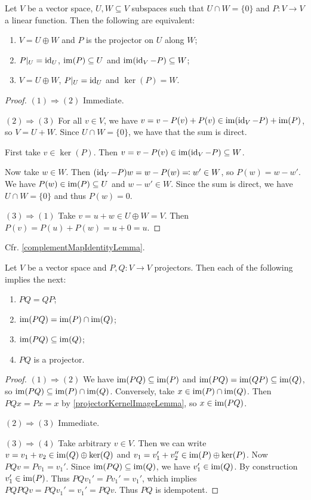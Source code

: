 \begin{lemma} \label{projectorEquivalentsLemma}
Let $V$ be a vector space, $U, W\subseteq V$  subspaces such that $U\cap W = \{0\}$ and $P: V\to V$ a linear function. Then the following are equivalent:
\begin{enumerate}
\item $V = U\oplus W$ and $P$ is the projector on $U$ along $W$;
\item $P|_U = \operatorname{id}_U$, $\operatorname{im}(P) \subseteq U$ and $\operatorname{im}(\operatorname{id}_V - P) \subseteq W$;
\item $V = U\oplus W$, $P|_U = \operatorname{id}_U$ and $\ker(P) = W$.
\end{enumerate}
\end{lemma}
\begin{proof}
$(1) \Rightarrow (2)$ Immediate.

$(2) \Rightarrow (3)$ For all $v\in V$, we have $v = v -P(v) + P(v) \in \operatorname{im}(\operatorname{id}_V - P) + \operatorname{im}(P)$, so $V = U+W$. Since $U\cap W = \{0\}$, we have that the sum is direct.

First take $v\in \ker(P)$. Then $v = v-P(v) \in \operatorname{im}(\operatorname{id}_V - P) \subseteq W$.

Now take $w\in W$. Then $(\operatorname{id}_V - P)w = w - P(w) \eqqcolon w' \in W$, so $P(w) = w - w'$. We have $P(w) \in \operatorname{im}(P) \subseteq U$ and $w-w'\in W$. Since the sum is direct, we have $U\cap W = \{0\}$ and thus $P(w) = 0$.

$(3) \Rightarrow (1)$ Take $v = u+w \in U\oplus W = V$. Then $P(v) = P(u)+ P(w) = u+0 = u$.
\end{proof}

Cfr. \ref{complementMapIdentityLemma}.

\begin{lemma} \label{commutingProjectorLemma}
Let $V$ be a vector space and $P,Q: V\to V$ projectors. Then each of the following implies the next:
\begin{enumerate}
\item $PQ = QP$;
\item $\operatorname{im}(PQ) = \operatorname{im}(P)\cap \operatorname{im}(Q)$;
\item $\operatorname{im}(PQ) \subseteq \operatorname{im}(Q)$;
\item $PQ$ is a projector.
\end{enumerate}
\end{lemma}
\begin{proof}
$(1) \Rightarrow (2)$ We have $\operatorname{im}(PQ) \subseteq \operatorname{im}(P)$ and $\operatorname{im}(PQ) = \operatorname{im}(QP) \subseteq \operatorname{im}(Q)$, so $\operatorname{im}(PQ) \subseteq \operatorname{im}(P)\cap \operatorname{im}(Q)$. Conversely, take $x\in \operatorname{im}(P)\cap\operatorname{im}(Q)$. Then $PQx = Px = x$ by \ref{projectorKernelImageLemma}, so $x\in \operatorname{im}(PQ)$.

$(2) \Rightarrow (3)$ Immediate.

$(3) \Rightarrow (4)$ Take arbitrary $v\in V$. Then we can write $v = v_1 + v_2 \in \operatorname{im}(Q)\oplus \ker(Q)$ and $v_1 = v_1' + v_2'' \in \operatorname{im}(P)\oplus \ker(P)$. Now $PQv = Pv_1 = v_1'$. Since $\operatorname{im}(PQ) \subseteq \operatorname{im}(Q)$, we have $v_1'\in \operatorname{im}(Q)$. By construction $v_1'\in \operatorname{im}(P)$. Thus $PQv_1' = Pv_1' = v_1'$, which implies $PQPQv = PQv_1' = v_1' = PQv$. Thus $PQ$ is idempotent.
\end{proof}

